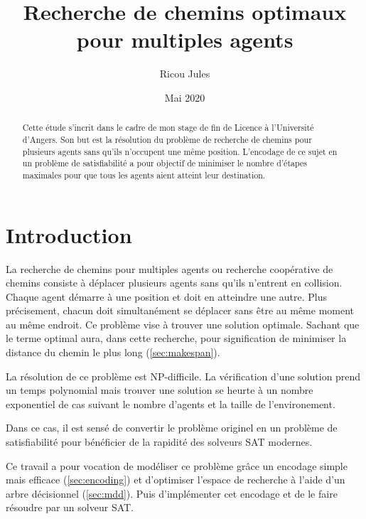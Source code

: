 \documentclass[french, 12pt, letterpaper]{article}
\title{Recherche de chemins optimaux pour multiples agents}
\author{Ricou Jules}
\date{Mai 2020}
\theoremstyle{definition}
\theoremstyle{proposition}
\theoremstyle{example}
\begin{document}
    \maketitle

    \begin{abstract}
        Cette étude s'incrit dans le cadre de mon stage de fin de Licence à l'Université d'Angers. 
        Son but est la résolution du problème de recherche de chemins pour plusieurs agents
        sans qu'ils n'occupent une même position.
        L'encodage de ce sujet en un problème de satisfiabilité a pour objectif 
        de minimiser le nombre d'étapes maximales pour que tous les agents aient atteint leur destination.
    \end{abstract}

    \newpage

    \tableofcontents

    \newpage
    \section*{Introduction}

    La recherche de chemins pour multiples agents ou recherche coopérative de chemins consiste 
    à déplacer plusieurs agents sans qu'ils n'entrent en collision.
    Chaque agent démarre à une position et doit en atteindre une autre. 
    Plus précisement, chacun doit simultanément se déplacer sans être au même moment au même endroit.
    Ce problème vise à trouver une solution optimale.
    Sachant que le terme optimal aura, dans cette recherche, pour signification de minimiser la distance du chemin
    le plus long (\ref{sec:makespan}).

    La résolution de ce problème est NP-difficile. 
    La vérification d'une solution prend un temps polynomial mais trouver une solution se heurte à un nombre exponentiel
    de cas suivant le nombre d'agents et la taille de l'environement.

    Dans ce cas, il est sensé de convertir le problème originel en un problème de satisfiabilité
    pour bénéficier de la rapidité des solveurs SAT modernes. 

    Ce travail a pour vocation de modéliser ce problème grâce un encodage simple mais efficace \cite{PSUR16} (\ref{sec:encoding})
    et d'optimiser l'espace de recherche à l'aide d'un arbre décisionnel (\ref{sec:mdd}).
    Puis d'implémenter cet encodage et de le faire résoudre par un solveur SAT.
\end{document}
